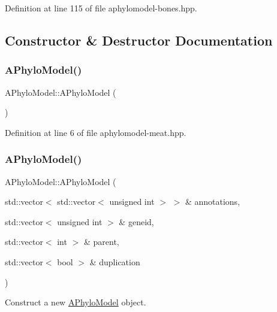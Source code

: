 Definition at line 115 of file aphylomodel-\/bones.\+hpp.



\subsection{Constructor \& Destructor Documentation}
\mbox{\label{class_a_phylo_model_a5055699d05235bbefb283298d9dee75d}} 
\subsubsection{\texorpdfstring{A\+Phylo\+Model()}{APhyloModel()}\hspace{0.1cm}{\footnotesize\ttfamily [1/2]}}
{\footnotesize\ttfamily A\+Phylo\+Model\+::\+A\+Phylo\+Model (\begin{DoxyParamCaption}{ }\end{DoxyParamCaption})}



Definition at line 6 of file aphylomodel-\/meat.\+hpp.

\mbox{\label{class_a_phylo_model_a4c0005c106a12f1b11ccd9f5ceac8d9c}} 
\subsubsection{\texorpdfstring{A\+Phylo\+Model()}{APhyloModel()}\hspace{0.1cm}{\footnotesize\ttfamily [2/2]}}
{\footnotesize\ttfamily A\+Phylo\+Model\+::\+A\+Phylo\+Model (\begin{DoxyParamCaption}\item[{std\+::vector$<$ std\+::vector$<$ unsigned int $>$ $>$ \&}]{annotations,  }\item[{std\+::vector$<$ unsigned int $>$ \&}]{geneid,  }\item[{std\+::vector$<$ int $>$ \&}]{parent,  }\item[{std\+::vector$<$ bool $>$ \&}]{duplication }\end{DoxyParamCaption})}



Construct a new \hyperlink{class_a_phylo_model}{A\+Phylo\+Model} object. 

